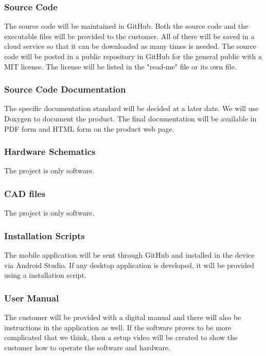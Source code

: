 \subsubsection{Source Code}
The source code will be maintained in GitHub. Both the source code and the executable files will be provided to the customer. All of there will be saved in a cloud service so that it can be downloaded as many times is needed. The source code will be posted in a public repository in GitHub for the general public with a MIT license. The license will be listed in the "read-me" file or its own file.

\subsubsection{Source Code Documentation}
The specific documentation standard will be decided at a later date. We will use Doxygen to document the product. The final documentation will be available in PDF form and HTML form on the product web page.

\subsubsection{Hardware Schematics}
The project is only software.

\subsubsection{CAD files}
The project is only software.

\subsubsection{Installation Scripts}
The mobile application will be sent through GitHub and installed in the device via Android Studio. If any desktop application is developed, it will be provided using a installation script. 

\subsubsection{User Manual}
The customer will be provided with a digital manual and there will also be instructions in the application as well. If the software proves to be more complicated that we think, then a setup video will be created to show the customer how to operate the software and hardware.
